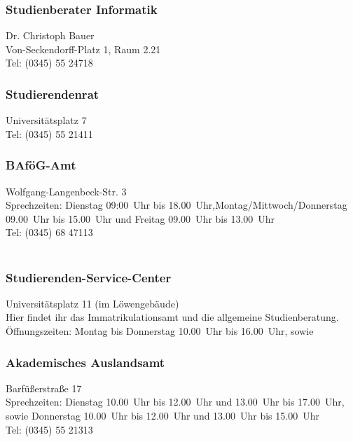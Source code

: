\subsubsection{Studienberater Informatik}
Dr. Christoph Bauer\\
Von-Seckendorff-Platz 1, Raum 2.21\\
Tel: (0345) 55 24718\\

\subsubsection{Studierendenrat}
Universitätsplatz 7\\
Tel: (0345) 55 21411\\

\subsubsection{BAföG-Amt}
Wolfgang-Langenbeck-Str. 3\\
Sprechzeiten: Dienstag 09:00~Uhr bis 18.00~Uhr,Montag/Mittwoch/Donnerstag 09.00~Uhr bis
15.00~Uhr und Freitag 09.00~Uhr bis 13.00~Uhr\\
Tel: (0345) 68 47113\\
\\

\subsubsection{Studierenden-Service-Center}
Universitätsplatz 11 (im Löwengebäude)\\
Hier findet ihr das Immatrikulationsamt und die allgemeine
Studienberatung.\\
Öffnungszeiten: Montag bis Donnerstag 10.00~Uhr bis 16.00~Uhr, sowie

\subsubsection{Akademisches Auslandsamt}
Barfüßerstraße 17\\
Sprechzeiten: Dienstag 10.00~Uhr bis 12.00~Uhr und 13.00~Uhr bis
17.00~Uhr, sowie Donnerstag 10.00~Uhr bis 12.00~Uhr und 13.00~Uhr bis
15.00~Uhr\\
Tel: (0345) 55 21313\\
\\


